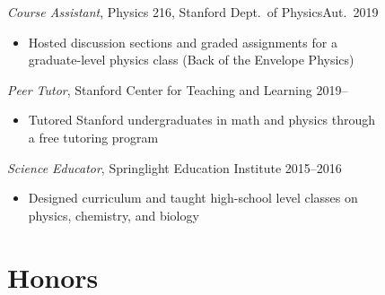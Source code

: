 \documentclass[margin,11pt]{res}
\newenvironment{myitemize}
{ \vspace{-1.5\topsep} \begin{itemize} }
{ \end{itemize} \vspace{-1.0\topsep}}
\begin{document}
\begin{resume}
\textit{Course Assistant}, Physics 216, Stanford Dept.\ of Physics\hfill Aut.\ 2019\\
\begin{myitemize}
    \item Hosted discussion sections and graded assignments for a\\
        graduate-level physics class (Back of the Envelope Physics) 
\end{myitemize}

\textit{Peer Tutor}, Stanford Center for Teaching and Learning \hfill 2019--\\
\begin{myitemize}
    \item Tutored Stanford undergraduates in math and physics through\\
        a free tutoring program
\end{myitemize}

\textit{Science Educator}, Springlight Education Institute \hfill 2015--2016\\
\begin{myitemize}
    \item Designed curriculum and taught high-school level classes on \\
        physics, chemistry, and biology
\end{myitemize}




\section{Honors}
 

\end{resume}
\end{document}
